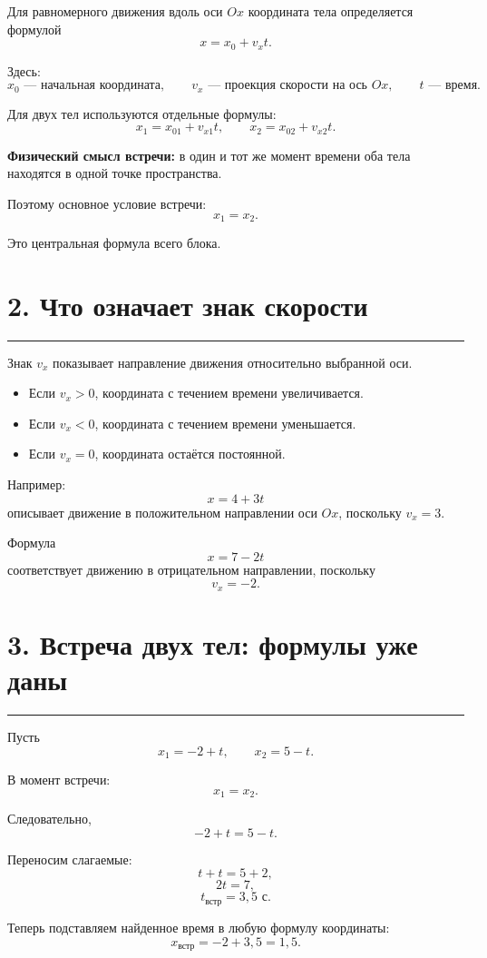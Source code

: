 \documentclass[a4paper,12pt]{article}
\newcommand{\sectionline}{%
    \vspace{-0.4em}
    {\color{accent}\rule{\linewidth}{0.7pt}}
    \vspace{0.4em}
}
\newcommand{\key}[1]{\textbf{\color{darkaccent}#1}}
\begin{document}
Для равномерного движения вдоль оси \(Ox\) координата тела определяется формулой
\[
\boxed{x=x_0+v_x t}.
\]

Здесь:
\[
x_0 \text{ --- начальная координата},\qquad
v_x \text{ --- проекция скорости на ось } Ox,\qquad
t \text{ --- время}.
\]

Для двух тел используются отдельные формулы:
\[
\boxed{x_1=x_{01}+v_{x1}t},
\qquad
\boxed{x_2=x_{02}+v_{x2}t}.
\]

\key{Физический смысл встречи:} в один и тот же момент времени оба тела находятся в одной точке пространства.

Поэтому основное условие встречи:
\[
\boxed{x_1=x_2}.
\]

Это центральная формула всего блока.

\section*{\color{darkaccent}2. Что означает знак скорости}
\sectionline

Знак \(v_x\) показывает направление движения относительно выбранной оси.

\begin{itemize}
    \item Если \(v_x>0\), координата с течением времени увеличивается.
    \item Если \(v_x<0\), координата с течением времени уменьшается.
    \item Если \(v_x=0\), координата остаётся постоянной.
\end{itemize}

Например:
\[
x=4+3t
\]
описывает движение в положительном направлении оси \(Ox\), поскольку \(v_x=3\).

Формула
\[
x=7-2t
\]
соответствует движению в отрицательном направлении, поскольку
\[
v_x=-2.
\]

\section*{\color{darkaccent}3. Встреча двух тел: формулы уже даны}
\sectionline

Пусть
\[
x_1=-2+t,
\qquad
x_2=5-t.
\]

В момент встречи:
\[
x_1=x_2.
\]

Следовательно,
\[
-2+t=5-t.
\]

Переносим слагаемые:
\[
t+t=5+2,
\]
\[
2t=7,
\]
\[
\boxed{t_{\text{встр}}=3{,}5\text{ с}}.
\]

Теперь подставляем найденное время в любую формулу координаты:
\[
x_{\text{встр}}=-2+3{,}5=1{,}5.
\]
\end{document}
